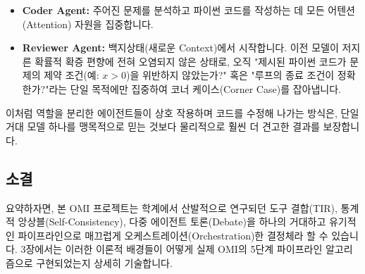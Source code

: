 \begin{itemize}
    \item \textbf{Coder Agent:} 주어진 문제를 분석하고 파이썬 코드를 작성하는 데 모든 어텐션(Attention) 자원을 집중합니다.
    \item \textbf{Reviewer Agent:} 백지상태(새로운 Context)에서 시작합니다. 이전 모델이 저지른 확률적 확증 편향에 전혀 오염되지 않은 상태로, 오직 "제시된 파이썬 코드가 문제의 제약 조건(예: $x > 0$)을 위반하지 않았는가?" 혹은 "루프의 종료 조건이 정확한가?"라는 단일 목적에만 집중하여 코너 케이스(Corner Case)를 잡아냅니다.
\end{itemize}
이처럼 역할을 분리한 에이전트들이 상호 작용하며 코드를 수정해 나가는 방식은, 단일 거대 모델 하나를 맹목적으로 믿는 것보다 물리적으로 훨씬 더 견고한 결과를 보장합니다.

\subsection{소결}
요약하자면, 본 OMI 프로젝트는 학계에서 산발적으로 연구되던 도구 결합(TIR), 통계적 앙상블(Self-Consistency), 다중 에이전트 토론(Debate)을 하나의 거대하고 유기적인 파이프라인으로 매끄럽게 오케스트레이션(Orchestration)한 결정체라 할 수 있습니다. 3장에서는 이러한 이론적 배경들이 어떻게 실제 OMI의 5단계 파이프라인 알고리즘으로 구현되었는지 상세히 기술합니다.
